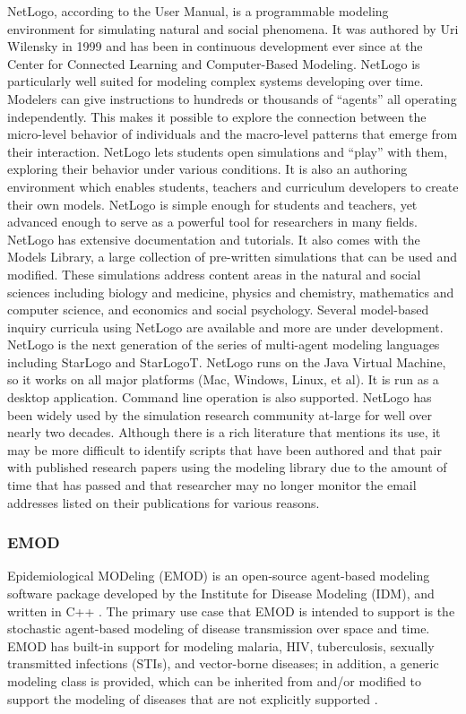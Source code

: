 \documentclass{article}
\begin{document}
NetLogo, according to the User Manual, is a programmable modeling environment for simulating natural and social phenomena. It was authored by Uri Wilensky in 1999 and has been in continuous development ever since at the Center for Connected Learning and Computer-Based Modeling. NetLogo is particularly well suited for modeling complex systems developing over time. Modelers can give instructions to hundreds or thousands of “agents” all operating independently. This makes it possible to explore the connection between the micro-level behavior of individuals and the macro-level patterns that emerge from their interaction. NetLogo lets students open simulations and “play” with them, exploring their behavior under various conditions. It is also an authoring environment which enables students, teachers and curriculum developers to create their own models. NetLogo is simple enough for students and teachers, yet advanced enough to serve as a powerful tool for researchers in many fields. NetLogo has extensive documentation and tutorials. It also comes with the Models Library, a large collection of pre-written simulations that can be used and modified. These simulations address content areas in the natural and social sciences including biology and medicine, physics and chemistry, mathematics and computer science, and economics and social psychology. Several model-based inquiry curricula using NetLogo are available and more are under development. NetLogo is the next generation of the series of multi-agent modeling languages including StarLogo and StarLogoT. NetLogo runs on the Java Virtual Machine, so it works on all major platforms (Mac, Windows, Linux, et al). It is run as a desktop application. Command line operation is also supported. \cite{tisue2004netlogo, nlweb} NetLogo has been widely used by the simulation research community at-large for well over nearly two decades. Although there is a rich literature that mentions its use, it may be more difficult to identify scripts that have been authored and that pair with published research papers using the modeling library due to the amount of time that has passed and that researcher may no longer monitor the email addresses listed on their publications for various reasons.

\subsubsection{EMOD}
Epidemiological MODeling (EMOD) is an open-source agent-based modeling software package developed by the Institute for Disease Modeling (IDM), and written in C++ \cite{emodRepo, emodDocs}. The primary use case that EMOD is intended to support is the stochastic agent-based modeling of disease transmission over space and time. EMOD has built-in support for modeling malaria, HIV, tuberculosis, sexually transmitted infections (STIs), and vector-borne diseases; in addition, a generic modeling class is provided, which can be inherited from and/or modified to support the modeling of diseases that are not explicitly supported \cite{emodDocs, emodRepo}. 
\end{document}
